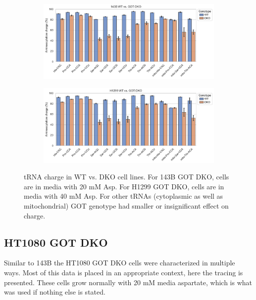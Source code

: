 \begin{figure}[!ht]
     \centering
     \begin{subfigure}[b]{0.8\textwidth}
         \includegraphics[width=\textwidth]{figures/sapp/DKO_char/143B-WT-DKO_charge.pdf}
     \end{subfigure}
     \begin{subfigure}[b]{0.8\textwidth}
         \vspace{2pt}
         \includegraphics[width=\textwidth]{figures/sapp/DKO_char/H1299-WT-DKO_charge.pdf}
     \end{subfigure}
     \hfill
        \caption[tRNA charge in WT vs. GOT DKO]{
        tRNA charge in WT vs. DKO cell lines.
        For 143B GOT DKO, cells are in media with 20 mM Asp.
        For H1299 GOT DKO, cells are in media with 40 mM Asp.
        For other tRNAs (cytoplasmic as well as mitochondrial) GOT genotype had smaller or insignificant effect on charge.
        }
        \label{fig:sapp:tRNA:WT_vs_DKO}
\end{figure}









\FloatBarrier
\subsection{HT1080 GOT DKO}
Similar to 143B the HT1080 GOT DKO cells were characterized in multiple ways.
Most of this data is placed in an appropriate context, here the \hCi{} tracing is presented.
These cells grow normally with 20 mM media aspartate, which is what was used if nothing else is stated.

